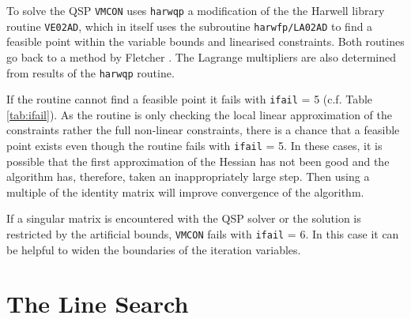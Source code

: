 \documentclass[11pt,a4paper]{report}
\newcommand{\ifail}{\mbox{\texttt{ifail}}}
\newcommand{\vmcon}{\mbox{\texttt{VMCON}}}
\begin{document}
To solve the QSP \vmcon\/ uses \texttt{harwqp} a modification of the the
Harwell library routine \texttt{VE02AD}, which in itself uses the subroutine
\texttt{harwfp/LA02AD} to find a feasible point within the variable bounds and
linearised constraints. Both routines go back to a method by Fletcher
\cite{Fletcher1970a,Fletcher1970b,Fletcher1970c}. The Lagrange multipliers are
also determined from results of the \texttt{harwqp} routine.

If the routine cannot find a feasible point it fails with \ifail\/ = 5
(c.f. Table \ref{tab:ifail}). As the routine is only checking the local linear
approximation of the constraints rather the full non-linear constraints, there
is a chance that a feasible point exists even though the routine fails with
\ifail\/ = 5. In these cases, it is possible that the first approximation of
the Hessian has not been good and the algorithm has, therefore, taken an
inappropriately large step. Then using a multiple of the identity matrix will
improve convergence of the algorithm.

If a singular matrix is encountered with the QSP solver or the solution is
restricted by the artificial bounds, \vmcon\/ fails with \ifail\/ = 6.  In
this case it can be helpful to widen the boundaries of the iteration
variables.


\section{The Line Search}
\label{sec:linesearch}
\end{document}
